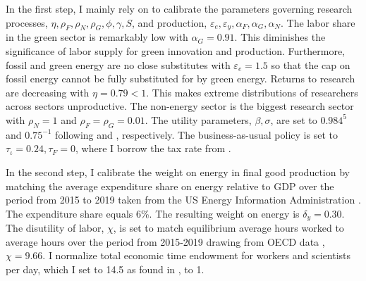 In the first step, I mainly rely on \cite{Fried2018ClimateAnalysis} to calibrate the parameters governing research processes, $\eta, \rho_F,\rho_N, \rho_G, \phi, \gamma, S $, and production, $\varepsilon_e, \varepsilon_y, \alpha_F, \alpha_G, \alpha_N$. The labor share in the green sector is remarkably low with $\alpha_G=0.91$. This diminishes the significance of labor supply for green innovation and production. Furthermore, fossil and green energy are no close substitutes with $\varepsilon_e=1.5$ so that the cap on fossil energy cannot be fully substituted for by green energy.
Returns to research are decreasing with $\eta=0.79<1$. This makes extreme distributions of researchers across sectors unproductive. The non-energy sector is the biggest research sector with $\rho_N=1$ and $\rho_F=\rho_G=0.01$. 
The utility parameters, $\beta, \sigma$, are set to $0.984^5$ and $0.75^{-1}$ following \cite{Barrage2019OptimalPolicy} and \cite{Chetty2011AreMargins}, respectively. The business-as-usual policy is set to $\tau_\iota=0.24, \tau_F=0$, where I borrow the tax rate from \cite{Barrage2019OptimalPolicy}. 

In the second step, I calibrate the weight on energy in final good production by matching the average expenditure share on energy relative to GDP over the period from 2015 to 2019 taken from the US Energy Information Administration \citep[][Table 1.7]{EIAEnergy}. The expenditure share equals 6\%. The resulting weight on energy is $\delta_y=0.30$. %
 The disutility of labor, $\chi$, is set to match equilibrium average hours worked to average hours over the period from 2015-2019 drawing from OECD data \citep{OECDHoursworked}, $\chi=9.66$. I normalize total economic time endowment for workers and scientists per day, which I set to 14.5 as found in \cite{Jones1993OptimalGrowth}, to 1. 

